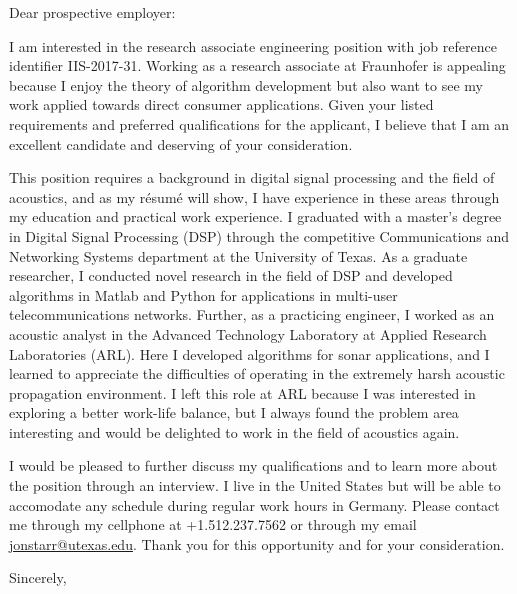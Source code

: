 \documentclass{letter}
\begin{document}
\begin{letter}{}
\opening{Dear prospective employer:}

I am interested in the research associate engineering position with job reference identifier IIS-2017-31.
Working as a research associate at Fraunhofer is appealing because
    I
        enjoy the theory of algorithm development but 
        also want to see my work applied towards direct consumer applications.
Given your listed requirements and preferred qualifications for the applicant,
I believe that I am an excellent candidate and deserving of your consideration.

This position requires a background in
    digital signal processing and 
    the field of acoustics, and
as my r\'{e}sum\'{e} will show,
I have experience in these areas through my education and practical work experience.
I graduated with a master's degree in Digital Signal Processing (DSP) through the competitive Communications and Networking Systems department at the University of Texas.
As a graduate researcher,
I conducted novel research in the field of DSP and developed algorithms in Matlab and Python for applications in multi-user telecommunications networks.
Further, as a practicing engineer,
I worked as an acoustic analyst in the Advanced Technology Laboratory at Applied Research Laboratories (ARL).
Here I developed algorithms for sonar applications, and
I learned to appreciate the difficulties of operating in the extremely harsh acoustic propagation environment.
I left this role at ARL because I was interested in exploring a better work-life balance, but
I always found the problem area interesting and would be delighted to work in the field of acoustics again.

I would be pleased to further discuss my qualifications and to learn more about the position through an interview.
I live in the United States but will be able to accomodate any schedule during regular work hours in Germany.
Please contact me through my cellphone at +1.512.237.7562 or through my email \mbox{\href{mailto:jonstarr@utexas.edu}{jonstarr@utexas.edu}}.
Thank you for this opportunity and for your consideration.

\closing{Sincerely,}


\end{letter}
\end{document}
